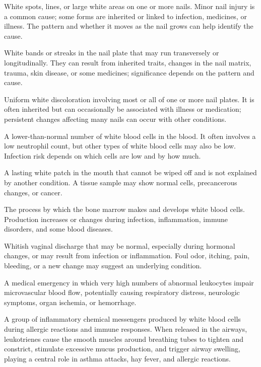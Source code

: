  White spots, lines, or large white areas on one or more nails. Minor nail injury is a common cause; some forms are inherited or linked to infection, medicines, or illness. The pattern and whether it moves as the nail grows can help identify the cause.

 White bands or streaks in the nail plate that may run transversely or longitudinally. They can result from inherited traits, changes in the nail matrix, trauma, skin disease, or some medicines; significance depends on the pattern and cause.

 Uniform white discoloration involving most or all of one or more nail plates. It is often inherited but can occasionally be associated with illness or medication; persistent changes affecting many nails can occur with other conditions.

 A lower-than-normal number of white blood cells in the blood. It often involves a low neutrophil count, but other types of white blood cells may also be low. Infection risk depends on which cells are low and by how much.

 A lasting white patch in the mouth that cannot be wiped off and is not explained by another condition. A tissue sample may show normal cells, precancerous changes, or cancer.

 The process by which the bone marrow makes and develops white blood cells. Production increases or changes during infection, inflammation, immune disorders, and some blood diseases.

 Whitish vaginal discharge that may be normal, especially during hormonal changes, or may result from infection or inflammation. Foul odor, itching, pain, bleeding, or a new change may suggest an underlying condition.

 A medical emergency in which very high numbers of abnormal leukocytes impair microvascular blood flow, potentially causing respiratory distress, neurologic symptoms, organ ischemia, or hemorrhage.

 A group of inflammatory chemical messengers produced by white blood cells during allergic reactions and immune responses. When released in the airways, leukotrienes cause the smooth muscles around breathing tubes to tighten and constrict, stimulate excessive mucus production, and trigger airway swelling, playing a central role in asthma attacks, hay fever, and allergic reactions.

